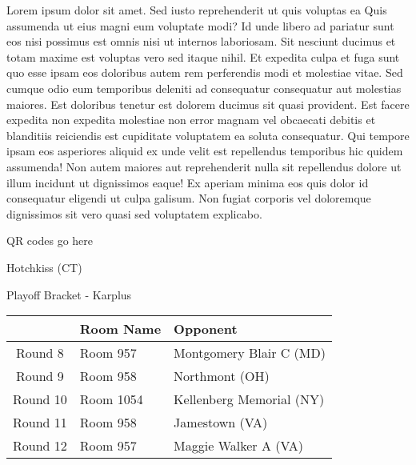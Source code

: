 \documentclass{article}%
\begin{document}
\vspace*{8pt}%
\linebreak%
\newline%
\newline%
Lorem ipsum dolor sit amet. Sed iusto reprehenderit ut quis voluptas ea Quis assumenda ut eius magni eum voluptate modi? Id unde libero ad pariatur sunt eos nisi possimus est omnis nisi ut internos laboriosam. Sit nesciunt ducimus et totam maxime est voluptas vero sed itaque nihil. Et expedita culpa et fuga sunt quo esse ipsam eos doloribus autem rem perferendis modi et molestiae vitae.\newline%
\newline%
Sed cumque odio eum temporibus deleniti ad consequatur consequatur aut molestias maiores. Est doloribus tenetur est dolorem ducimus sit quasi provident. Est facere expedita non expedita molestiae non error magnam vel obcaecati debitis et blanditiis reiciendis est cupiditate voluptatem ea soluta consequatur. Qui tempore ipsam eos asperiores aliquid ex unde velit est repellendus temporibus hic quidem assumenda!\newline%
\newline%
Non autem maiores aut reprehenderit nulla sit repellendus dolore ut illum incidunt ut dignissimos eaque! Ex aperiam minima eos quis dolor id consequatur eligendi ut culpa galisum. Non fugiat corporis vel doloremque dignissimos sit vero quasi sed voluptatem explicabo.\newline%
\newline%
%
\vspace*{30pt}%
\begin{center}%
\begin{Huge}%
QR codes go here%
\end{Huge}%
\end{center}%
\newpage%
\begin{center}%
\begin{Huge}%
Hotchkiss (CT)%
\end{Huge}%
\vspace*{8pt}%
\linebreak%
\begin{Large}%
Playoff Bracket {-} Karplus%
\end{Large}%
\end{center}%
%
\begin{tabularx}{\textwidth}{|c|Y|Y|}%
\hline%
&Room Name&Opponent\\%
\hline%
Round 8&Room 957&Montgomery Blair C (MD)\\%
Round 9&Room 958&Northmont (OH)\\%
Round 10&Room 1054&Kellenberg Memorial (NY)\\%
Round 11&Room 958&Jamestown (VA)\\%
Round 12&Room 957&Maggie Walker A (VA)\\%
\hline%
\end{tabularx}%
\end{document}
